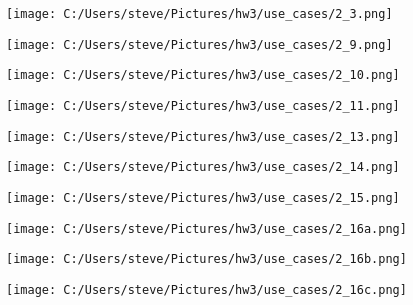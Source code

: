 \documentclass[10pt,a4paper]{article}
\begin{document}
\begin{center}
\texttt{[image: C:/Users/steve/Pictures/hw3/use\_cases/2\_3.png]}
\end{center}

\begin{center}
\texttt{[image: C:/Users/steve/Pictures/hw3/use\_cases/2\_9.png]}
\end{center}

\begin{center}
\texttt{[image: C:/Users/steve/Pictures/hw3/use\_cases/2\_10.png]}
\end{center}

\begin{center}
\texttt{[image: C:/Users/steve/Pictures/hw3/use\_cases/2\_11.png]}
\end{center}

\begin{center}
\texttt{[image: C:/Users/steve/Pictures/hw3/use\_cases/2\_13.png]}
\end{center}

\begin{center}
\texttt{[image: C:/Users/steve/Pictures/hw3/use\_cases/2\_14.png]}
\end{center}

\begin{center}
\texttt{[image: C:/Users/steve/Pictures/hw3/use\_cases/2\_15.png]}
\end{center}

\begin{center}
\texttt{[image: C:/Users/steve/Pictures/hw3/use\_cases/2\_16a.png]}
\end{center}

\begin{center}
\texttt{[image: C:/Users/steve/Pictures/hw3/use\_cases/2\_16b.png]}
\end{center}

\begin{center}
\texttt{[image: C:/Users/steve/Pictures/hw3/use\_cases/2\_16c.png]}
\end{center}
\end{document}
